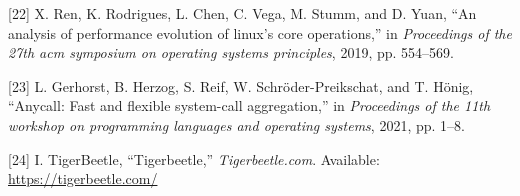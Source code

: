 \documentclass[conference]{IEEEtran}{article}
\begin{document}
\begin{hangparas}{1.5em}{1}
\hypertarget{citeproc_bib_item_22}{[22] X. Ren, K. Rodrigues, L. Chen, C. Vega, M. Stumm, and D. Yuan, “An analysis of performance evolution of linux’s core operations,” in \textit{Proceedings of the 27th acm symposium on operating systems principles}, 2019, pp. 554–569.}

\hypertarget{citeproc_bib_item_23}{[23] L. Gerhorst, B. Herzog, S. Reif, W. Schröder-Preikschat, and T. Hönig, “Anycall: Fast and flexible system-call aggregation,” in \textit{Proceedings of the 11th workshop on programming languages and operating systems}, 2021, pp. 1–8.}

\hypertarget{citeproc_bib_item_24}{[24] I. TigerBeetle, “Tigerbeetle,” \textit{Tigerbeetle.com}. Available: \url{https://tigerbeetle.com/}}\bigskip
\end{hangparas}
\end{document}
